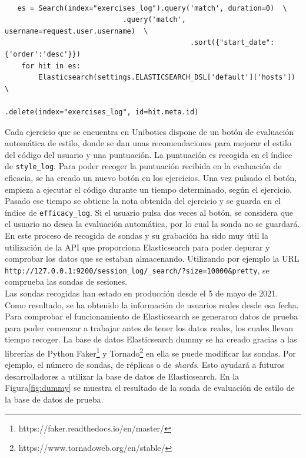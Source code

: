 \\
{\footnotesize
\begin{verbatim}
   es = Search(index="exercises_log").query('match', duration=0)  \
   				            .query('match', username=request.user.username)  \
        					                .sort({"start_date": {'order':'desc'}})
    for hit in es:
        Elasticsearch(settings.ELASTICSEARCH_DSL['default']['hosts'])  \ 
    				                        .delete(index="exercises_log", id=hit.meta.id)
\end{verbatim}
}
\newpage
Cada ejercicio que se encuentra en Unibotics dispone de un botón de evaluación automática de estilo, donde se dan unas recomendaciones para mejorar el estilo del código del usuario y una puntuación. La puntuación es recogida en el índice de \texttt{style\_log}. Para poder recoger la puntuación recibida en la evaluación de eficacia, se ha creado un nuevo botón en los ejercicios. Una vez pulsado el botón, empieza a ejecutar el código durante un tiempo determinado, según el ejercicio. Pasado ese tiempo se obtiene la nota obtenida del ejercicio y se guarda en el índice de \texttt{efficacy\_log}. Si el usuario pulsa dos veces al botón, se considera que el usuario no desea la evaluación automática, por lo cual la sonda no se guardará.\\


En este proceso de recogida de sondas y su grabación ha sido muy útil la utilización de la API que proporciona Elasticsearch para poder depurar y comprobar los datos que se estaban almacenando. Utilizando por ejemplo la URL    \newline       \texttt{http://127.0.0.1:9200/session\_log/\_search/?size=10000&pretty}, se comprueba las sondas de sesiones.\\

Las sondas recogidas han estado en producción desde el 5 de mayo de 2021. Como resultado, se ha obtenido la información de usuarios reales desde esa fecha.\\

Para comprobar el funcionamiento de Elasticsearch se generaron datos de prueba para poder comenzar a trabajar antes de tener los datos reales, los cuales llevan tiempo recoger. La base de datos Elasticsearch dummy se ha creado gracias a las librerías de Python Faker\footnote{https://faker.readthedocs.io/en/master/} y Tornado\footnote{https://www.tornadoweb.org/en/stable/} en ella se puede modificar las sondas. Por ejemplo, el número de sondas, de réplicas o de \textit{shards}. Esto ayudará a futuros desarrolladores a utilizar la base de datos de Elasticsearch. En la Figura\ref{fig:dummy} se muestra el resultado de la sonda de evaluación de estilo de la base de datos de prueba.



